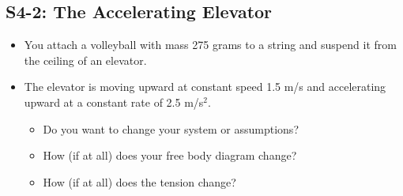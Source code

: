 \documentclass[]{article}
\begin{document}
\begin{PresentSpace}
\vspace{-10pt}
\section*{S4-2: The Accelerating Elevator}
\vspace{-10pt}
\begin{itemize}
	\item You attach a volleyball with mass 275 grams to a string and suspend it from the ceiling of an elevator.
	\item The elevator is moving upward at constant speed 1.5 m/s and accelerating upward at a constant rate of 2.5 m/s$^{2}$.
	\begin{itemize}
		\item Do you want to change your system or assumptions?
		\item How (if at all) does your free body diagram change?
		\item How (if at all) does the tension change?
	\end{itemize}
\end{itemize}
\end{PresentSpace}
\newpage
\end{document}
